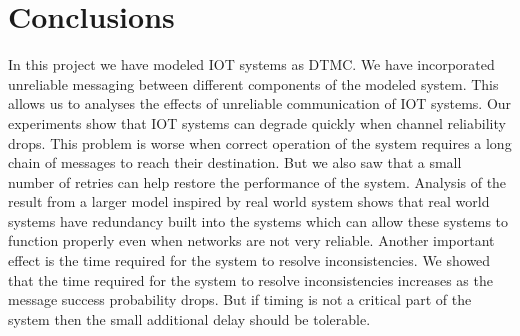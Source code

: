 \section{Conclusions}
In this project we have modeled IOT systems as DTMC. We have incorporated unreliable messaging between different components of the modeled system. This allows us to analyses the effects of unreliable communication of IOT systems. Our experiments show that IOT systems can degrade quickly when channel reliability drops. This problem is worse when correct operation of the system requires a long chain of messages to reach their destination. But we also saw that a small number of retries can help restore the performance of the system. Analysis of the result from a larger model inspired by real world system shows that real world systems have redundancy built into the systems which can allow these systems to function properly even when networks are not very reliable. Another important effect is the time required for the system to resolve inconsistencies. We showed that the time required for the system to resolve inconsistencies increases as the message success probability drops. But if timing is not a critical part of the system then the small additional delay should be tolerable.